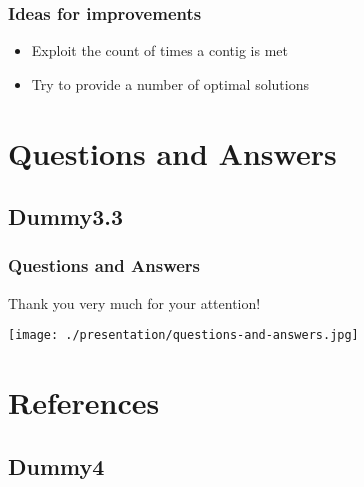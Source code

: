 \documentclass[compress]{beamer}
\begin{document}
  \begin{frame}
    \frametitle{Ideas for improvements}
    \begin{itemize}
      \item Exploit the count of times a contig is met
      \item Try to provide a number of optimal solutions
    \end{itemize}
  \end{frame}

\section*{Questions and Answers} %
\label{sec:Questions and Answers}

\subsection*{Dummy3.3} %
\label{sub:Dummy3.3}

  \begin{frame}
    \frametitle{Questions and Answers}
    \begin{multicols}{2}
      \begin{minipage}[c][0.5\textheight][c]{\columnwidth}
        \centering
        Thank you very much for your attention!
      \end{minipage}
      \columnbreak
      {\texttt{[image: ./presentation/questions-and-answers.jpg]}}
      \vfill
    \end{multicols}
  \end{frame}


\section{References} %
\label{sec:References}
\subsection*{Dummy4} %
\label{sub:Dummy4}
\end{document}
